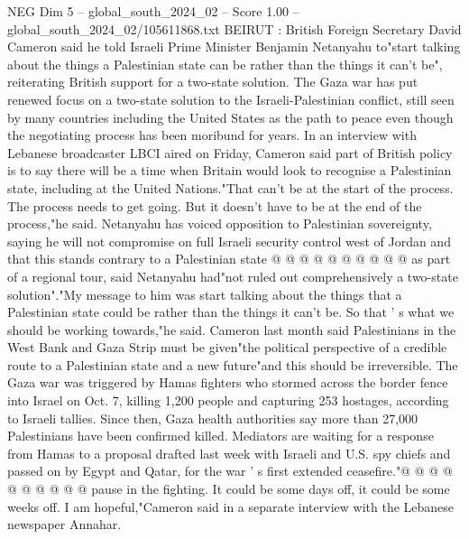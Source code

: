 \begin{textsample}{NEG Dim 5 – global\_south\_2024\_02 – Score 1.00 – global\_south\_2024\_02/105611868.txt}  \label{ex:f5_neg_309}
BEIRUT : British Foreign Secretary David Cameron said he told Israeli Prime Minister Benjamin Netanyahu to"start talking about the things a Palestinian state can be rather than the things it can't be", reiterating British support for a two-state solution.
The Gaza war has put renewed focus on a two-state solution to the Israeli-Palestinian conflict, still seen by many countries including the United States as the path to peace even though the negotiating process has been moribund for years.
In an interview with Lebanese broadcaster LBCI aired on Friday, Cameron said part of British policy is to say there will be a time when Britain would look to recognise a Palestinian state, including at the United Nations."That can't be at the start of the process.
The process needs to get going.
But it doesn't have to be at the end of the process,"he said.
Netanyahu has voiced opposition to Palestinian sovereignty, saying he will not compromise on full Israeli security control west of Jordan and that this stands contrary to a Palestinian state @ @ @ @ @ @ @ @ @ @ as part of a regional tour, said Netanyahu had"not ruled out comprehensively a two-state solution"."My message to him was start talking about the things that a Palestinian state could be rather than the things it can't be.
So that ' s what we should be working towards,"he said.
Cameron last month said Palestinians in the West Bank and Gaza Strip must be given"the political perspective of a credible route to a Palestinian state and a new future"and this should be irreversible.
The Gaza war was triggered by Hamas fighters who stormed across the border fence into Israel on Oct. 7, killing 1,200 people and capturing 253 hostages, according to Israeli tallies.
Since then, Gaza health authorities say more than 27,000 Palestinians have been confirmed killed.
Mediators are waiting for a response from Hamas to a proposal drafted last week with Israeli and U.S. spy chiefs and passed on by Egypt and Qatar, for the war ' s first extended ceasefire."@ @ @ @ @ @ @ @ @ @ pause in the fighting.
It could be some days off, it could be some weeks off.
I am hopeful,"Cameron said in a separate interview with the Lebanese newspaper Annahar.

\end{textsample}

